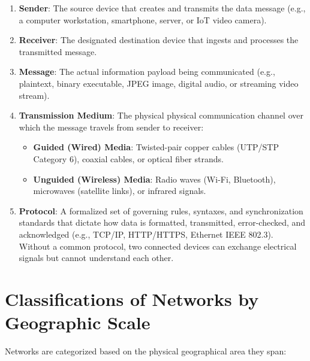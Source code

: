 \begin{enumerate}[leftmargin=1.5em]
    \item \textbf{Sender}: The source device that creates and transmits the data message (e.g., a computer workstation, smartphone, server, or IoT video camera).
    \item \textbf{Receiver}: The designated destination device that ingests and processes the transmitted message.
    \item \textbf{Message}: The actual information payload being communicated (e.g., plaintext, binary executable, JPEG image, digital audio, or streaming video stream).
    \item \textbf{Transmission Medium}: The physical physical communication channel over which the message travels from sender to receiver:
    \begin{itemize}
        \item \textbf{Guided (Wired) Media}: Twisted-pair copper cables (UTP/STP Category 6), coaxial cables, or optical fiber strands.
        \item \textbf{Unguided (Wireless) Media}: Radio waves (Wi-Fi, Bluetooth), microwaves (satellite links), or infrared signals.
    \end{itemize}
    \item \textbf{Protocol}: A formalized set of governing rules, syntaxes, and synchronization standards that dictate how data is formatted, transmitted, error-checked, and acknowledged (e.g., TCP/IP, HTTP/HTTPS, Ethernet IEEE 802.3). Without a common protocol, two connected devices can exchange electrical signals but cannot understand each other.
\end{enumerate}

\section{Classifications of Networks by Geographic Scale}

Networks are categorized based on the physical geographical area they span:

